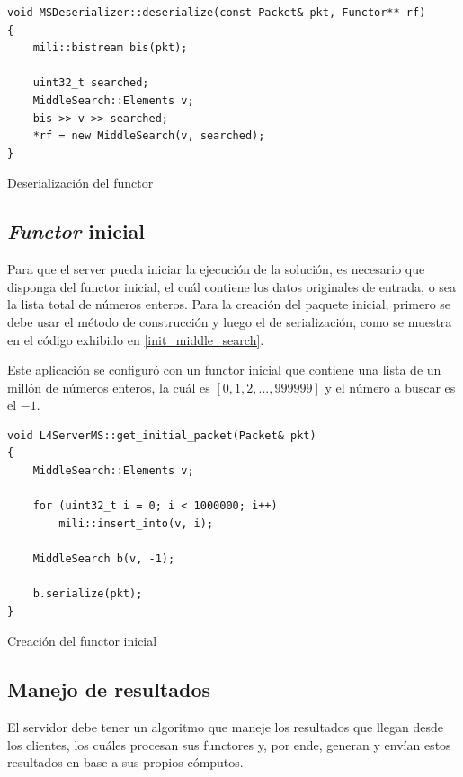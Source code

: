\begin{table}[ht]
    \lstset{language=C++}
    \begin{lstlisting}[frame=single]
void MSDeserializer::deserialize(const Packet& pkt, Functor** rf)
{
    mili::bistream bis(pkt);

    uint32_t searched;
    MiddleSearch::Elements v;
    bis >> v >> searched;
    *rf = new MiddleSearch(v, searched);
}
    \end{lstlisting}
    \centering
    \caption{Deserialización del functor}
    \label{deserialize_middle_search}
\end{table}

\subsection{\textit{Functor} inicial}

Para que el server pueda iniciar la ejecución de la solución, es necesario que disponga del functor inicial, el cuál contiene los datos
originales de entrada, o sea la lista total de números enteros. Para la creación del paquete inicial, primero se debe usar el método
de construcción y luego el de serialización, como se muestra en el código exhibido en \ref{init_middle_search}.

Este aplicación se configuró con un functor inicial que contiene una lista de un millón de números enteros, la cuál es $[0, 1, 2, ...,
999999]$ y el número a buscar es el $-1$.

\begin{table}[ht]
    \lstset{language=C++}
    \begin{lstlisting}[frame=single]
void L4ServerMS::get_initial_packet(Packet& pkt)
{
    MiddleSearch::Elements v;

    for (uint32_t i = 0; i < 1000000; i++)
        mili::insert_into(v, i);

    MiddleSearch b(v, -1);

    b.serialize(pkt);
}
    \end{lstlisting}
    \centering
    \caption{Creación del functor inicial}
    \label{init_middle_search}
\end{table}

\subsection{Manejo de resultados}

El servidor debe tener un algoritmo que maneje los resultados que llegan desde los clientes, los cuáles procesan sus functores y, por
ende, generan y envían estos resultados en base a sus propios cómputos.

